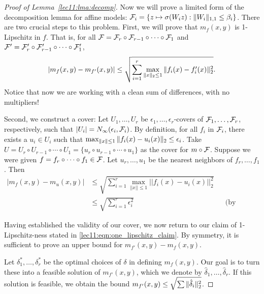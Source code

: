 \begin{proof}[Proof of Lemma~\ref{lec11:lma:decomp}]
	Now we will prove a limited form of the decomposition lemma for affine models: $\mathcal F_i = \{ z \mapsto \sigma(W_i z): \|W_i\|_{1, 1} \leq \beta_i \}$. There are two crucial steps to this problem. First, we will prove that $m_f(x, y)$ is 1-Lipschitz in $f$. That is, for all $\mathcal F = \mathcal F_r \circ \mathcal F_{r-1} \circ \cdots \circ \mathcal F_1$ and $\mathcal F' = \mathcal F_r' \circ 
	\mathcal F_{r-1}' \circ \cdots \circ \mathcal F_1'$,
	\begin{align}
	\left\lvert m_f(x, y) - m_{f'}(x, y)\right\rvert \leq \sqrt{\sum_{i=1}^r \max_{\|x\|_2 \leq 1} \|f_i(x) - f_i'(x)\|_2^2}. \label{lec11:eqn:one_lipschitz_claim}
	\end{align}
	Notice that now we are working with a clean sum of differences, with no multipliers! 
	
	Second, we construct a cover: Let $U_1, \dots, U_r$ be $\epsilon_1, \dots, \epsilon_r$-covers of $\mathcal F_1, \dots, \mathcal F_r$, respectively, such that $\left\lvert U_i\right\rvert = N_\infty(\epsilon_i, \mathcal F_i)$. By definition, for all $f_i$ in $\mathcal F_i$, there exists a $u_i \in U_i$ such that $\max_{\|x\| \leq 1} \|f_i(x) - u_i(x)\|_2 \leq \epsilon_i$. Take $U = U_r \circ U_{r-1} \circ \cdots \circ U_1 = \{u_r \circ u_{r-1} \circ \cdots \circ u_1 \}$ as the cover for $m \circ \mathcal F$. Suppose we were given $f = f_r \circ \cdots \circ f_1 \in \mathcal F$. Let $u_r, \dots, u_1$ be the nearest neighbors of $f_r, \dots, f_1$. Then
	\begin{align}
	|m_f(x, y) - m_u(x, y)| &\leq \sqrt{\sum_{i=1}^r \max_{||x|| \leq 1} ||f_i(x) - u_i(x)||_2^2} \\
	&\leq \sqrt{\sum_{i=1}^r \epsilon_i^2} &&\text{(by construction).}
	\end{align}
	
	Having established the validity of our cover, we now return to our claim of 1-Lipschitz-ness stated in \eqref{lec11:eqn:one_lipschitz_claim}. By symmetry, it is sufficient to prove an upper bound for $m_{f'}(x, y) - m_f(x, y)$.
	
	Let $\delta_1^*, \dots, \delta_r^*$ be the optimal choices of $\delta$ in defining $m_f(x, y)$. Our goal is to turn these into a feasible solution of $m_{f'}(x, y)$, which we denote by $\hat{\delta}_1, \dots, \hat{\delta}_r$. If this solution is feasible, we obtain the bound $m_{f'}(x, y) \leq \sqrt{\sum \|\hat{\delta}_i\|^2_2}$.
	

\end{proof}
